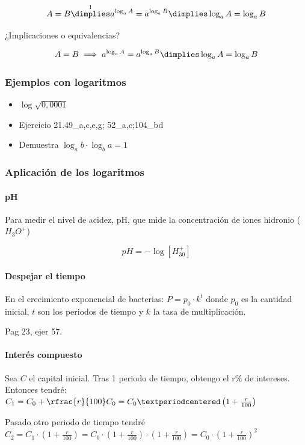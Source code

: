 \[
A = B \overset{1}{\dimplies} a^{\log_a A} = a^{\log_a B} \dimplies \log_aA=\log_aB
\]

¿Implicaciones o equivalencias?


\[
A = B \implies a^{\log_a A} = a^{\log_a B} \dimplies \log_aA=\log_aB
\]


\subsubsection{Ejemplos con logaritmos}

\begin{itemize}
	\item $\log \sqrt{0,0001}$
	\item Ejercicio 21.49\_a,c,e,g; 52\_a,c;104\_bd
	\item Demuestra $\log_a b · \log_b a = 1$ 
\end{itemize}

\subsubsection{Aplicación de los logaritmos}

\paragraph{pH}

Para medir el nivel de acidez, pH, que mide la concentración de iones hidronio ($H_3O^+$)

\[pH=-\log[H_30^+]\]

\paragraph*{Despejar el tiempo} En el crecimiento exponencial de bacterias:
$P = p_0·k^t$ donde $p_0$ es la cantidad inicial, $t$ son los periodos de tiempo y $k$ la tasa de multiplicación.

Pag 23, ejer 57.

\paragraph{Interés compuesto}


Sea $C$ el capital inicial. Tras 1 periodo de tiempo, obtengo el r\% de intereses. Entonces tendré: $C_1 = C_0 + \rfrac{r}{100}C_0 = C_0·\left(1+\frac{r}{100}\right)$

Pasado otro periodo de tiempo tendré $C_2 = C_1·\left(1+\frac{r}{100}\right) = C_0·\left(1+\frac{r}{100}\right)·\left(1+\frac{r}{100}\right) = C_0 ·\left(1+\frac{r}{100}\right)^2$

